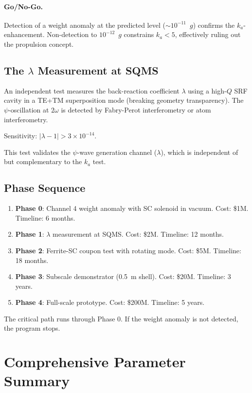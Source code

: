 \documentclass[12pt,aps,prd,superscriptaddress,nofootinbib,longbibliography]{revtex4-2}
\newcommand{\ka}{k_a}
\begin{document}
\paragraph{Go/No-Go.}
Detection of a weight anomaly at the predicted level ($\sim 10^{-11}$~$g$)
confirms the $\ka$-enhancement.  Non-detection to $10^{-12}$~$g$
constrains $\ka < 5$, effectively ruling out the propulsion concept.

\subsection{The $\lambda$ Measurement at SQMS}

An independent test measures the back-reaction coefficient $\lambda$ using
a high-$Q$ SRF cavity in a TE+TM superposition mode (breaking geometry
transparency).  The $\psi$-oscillation at $2\omega$ is detected by
Fabry-Perot interferometry or atom interferometry.

Sensitivity: $|\lambda - 1| > 3 \times 10^{-14}$.

This test validates the $\psi$-wave generation channel ($\lambda$), which
is independent of but complementary to the $\ka$ test.

\subsection{Phase Sequence}

\begin{enumerate}
\item \textbf{Phase 0}: Channel 4 weight anomaly with SC solenoid
in vacuum.  Cost: \$1M.  Timeline: 6 months.
\item \textbf{Phase 1}: $\lambda$ measurement at SQMS.
Cost: \$2M.  Timeline: 12 months.
\item \textbf{Phase 2}: Ferrite-SC coupon test with rotating mode.
Cost: \$5M.  Timeline: 18 months.
\item \textbf{Phase 3}: Subscale demonstrator (0.5~m shell).
Cost: \$20M.  Timeline: 3 years.
\item \textbf{Phase 4}: Full-scale prototype.
Cost: \$200M.  Timeline: 5 years.
\end{enumerate}

The critical path runs through Phase 0.  If the weight anomaly is not
detected, the program stops.


\section{Comprehensive Parameter Summary}\label{sec:summary}
\end{document}
